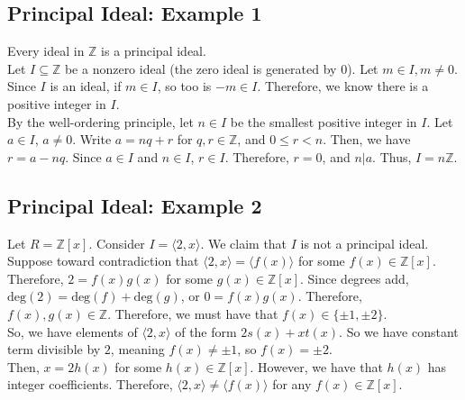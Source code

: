 \documentclass[8pt]{extarticle}
\newcommand{\Z}{\mathbb{Z}}
\begin{document}
  \subsection{Principal Ideal: Example 1}%
  Every ideal in $\Z$ is a principal ideal.\\

  Let $I\subseteq \Z$ be a nonzero ideal (the zero ideal is generated by $0$). Let $m\in I, m\neq 0$. Since $I$ is an ideal, if $m\in I$, so too is $-m\in I$. Therefore, we know there is a positive integer in $I$.\\

  By the well-ordering principle, let $n\in I$ be the smallest positive integer in $I$. Let $a\in I$, $a\neq 0$. Write $a = nq + r$ for $q,r\in \Z$, and $0\leq r < n$. Then, we have $r = a-nq$. Since $a\in I$ and $n\in I$, $r\in I$. Therefore, $r = 0$, and $n|a$. Thus, $I = n\Z$.
  \subsection{Principal Ideal: Example 2}%
  Let $R = \Z[x]$. Consider $I = \langle 2,x\rangle$. We claim that $I$ is not a principal ideal.\\

  Suppose toward contradiction that $\langle 2,x\rangle = \langle f(x)\rangle$ for some $f(x)\in \Z[x]$. Therefore, $2 = f(x)g(x)$ for some $g(x)\in \Z[x]$. Since degrees add, $\text{deg}(2) = \text{deg}(f) + \text{deg}(g)$, or $0= f(x)g(x)$. Therefore, $f(x),g(x)\in \Z$. Therefore, we must have that $f(x) \in \{\pm 1,\pm 2\}.$\\

  So, we have elements of $\langle 2,x\rangle$ of the form $2s(x) + xt(x)$. So we have constant term divisible by $2$, meaning $f(x) \neq \pm 1$, so $f(x) = \pm 2$.\\

  Then, $x = 2h(x)$ for some $h(x) \in \Z[x]$. However, we have that $h(x)$ has integer coefficients. Therefore, $\langle 2,x\rangle \neq \langle f(x)\rangle$ for any $f(x)\in \Z[x]$.
\end{document}
